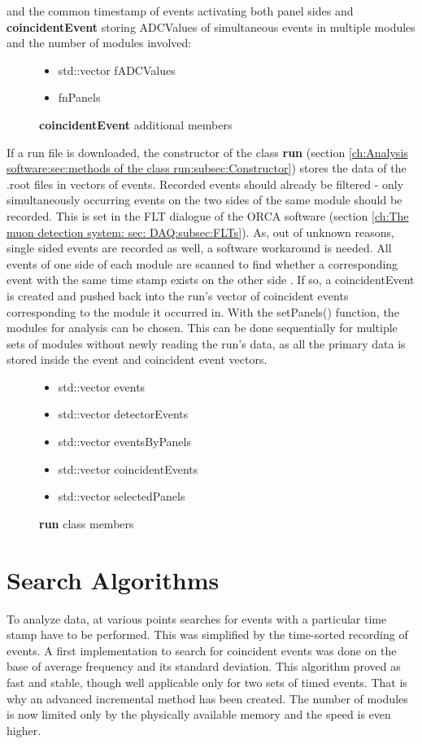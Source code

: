     and the common timestamp of events activating both panel sides and
    {\bf coincidentEvent} storing ADCValues of simultaneous events in multiple modules and the number of modules involved:
    \begin{figure}[H]
      \caption*{{\bf coincidentEvent} additional members}
	\begin{itemize}
	  \item std::vector fADCValues
	  \item fnPanels
      \end{itemize}
    \end{figure}
    If a run file is downloaded, the constructor of the class {\bf run} (section \ref{ch:Analysis software:sec:methods of the class run:subsec:Constructor}) stores the data of the .root files in vectors of events.
    Recorded events should already be filtered - only simultaneously occurring events on the two sides of the same module should be recorded. This is set in the FLT dialogue of the ORCA software (section \ref{ch:The muon detection system: sec: DAQ:subsec:FLTs}). As, out of unknown reasons, single sided events are recorded as well, a software workaround is needed. All events of one side of each module are scanned to find whether a corresponding event with the same time stamp exists on the other side . If so, a coincidentEvent is created and pushed back into the run's vector of coincident events corresponding to the module it occurred in.
    With the setPanels() function, the modules for analysis can be chosen. This can be done sequentially for multiple sets of modules without newly reading the run's data, as all the primary data is stored inside the event and coincident event vectors.
    \begin{figure}[h]
      \caption*{{\bf run} class members}
	\begin{itemize}
	  \item std::vector events
	  \item std::vector detectorEvents
	  \item std::vector eventsByPanels
	  \item std::vector coincidentEvents
	  \item std::vector selectedPanels
      \end{itemize}
    \end{figure}
    
    
  
  \section{Search Algorithms}
  \label{ch:Analysis software:sec:Search algorithms}
    To analyze data, at various points searches for events with a particular time stamp have to be performed. This was simplified by the time-sorted recording of events. A first implementation to search for coincident events was done on the base of average frequency and its standard deviation. This algorithm proved as fast and stable, though well applicable only for two sets of timed events. That is why an advanced incremental method has been created. The number of modules is now limited only by the physically available memory and the speed is even higher.
